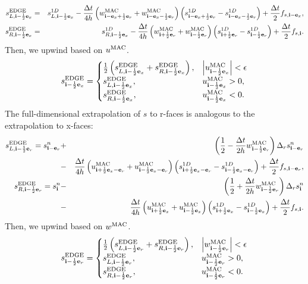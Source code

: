 \begin{eqnarray}
s_{L,{\bf i}-\frac{1}{2}{\bf e}_x}^{\rm EDGE} &=& s_{L,{\bf i}-\frac{1}{2}{\bf e}_x}^{1D} - \frac{\Delta t}{4h}\left(w_{{\bf i}-{\bf e}_x+\frac{1}{2}{\bf e}_r}^{\rm MAC}+w_{{\bf i}-{\bf e}_x-\frac{1}{2}{\bf e}_r}^{\rm MAC}\right)\left(s_{{\bf i}-{\bf e}_x+\frac{1}{2}{\bf e}_r}^{1D} - s_{{\bf i}-{\bf e}_x-\frac{1}{2}{\bf e}_r}^{1D}\right) + \frac{\Delta t}{2}f_{s,{\bf i}-{\bf e}_x}, \\
s_{R,{\bf i}-\frac{1}{2}{\bf e}_x}^{\rm EDGE} &=& s_{R,{\bf i}-\frac{1}{2}{\bf e}_x}^{1D} - \frac{\Delta t}{4h}\left(w_{{\bf i}+\frac{1}{2}{\bf e}_r}^{\rm MAC}+w_{{\bf i}-\frac{1}{2}{\bf e}_r}^{\rm MAC}\right)\left(s_{{\bf i}+\frac{1}{2}{\bf e}_r}^{1D} - s_{{\bf i}-\frac{1}{2}{\bf e}_r}^{1D}\right) + \frac{\Delta t}{2}f_{s,{\bf i}}.
\end{eqnarray}
Then, we upwind based on $u^{\rm MAC}$.
\begin{equation}
s_{{\bf i}-\frac{1}{2}{\bf e}_x}^{\rm EDGE} =
\begin{cases}
\frac{1}{2}\left(s_{L,{\bf i}-\frac{1}{2}{\bf e}_x}^{\rm EDGE} + s_{R,{\bf i}-\frac{1}{2}{\bf e}_x}^{\rm EDGE}\right), & \left|u^{\rm MAC}_{{\bf i}-\frac{1}{2}{\bf e}_x}\right| < \epsilon \\
s_{L,{\bf i}-\frac{1}{2}{\bf e}_x}^{\rm EDGE}, & u^{\rm MAC}_{{\bf i}-\frac{1}{2}{\bf e}_x} > 0, \\
s_{R,{\bf i}-\frac{1}{2}{\bf e}_x}^{\rm EDGE}, & u^{\rm MAC}_{{\bf i}-\frac{1}{2}{\bf e}_x} < 0.
\end{cases}
\end{equation}
The full-dimensional extrapolation of $s$ to r-faces is analogous to
the extrapolation to x-faces:
\begin{eqnarray}
s_{L,{\bf i}-\frac{1}{2}{\bf e}_r}^{\rm EDGE} = s_{{\bf i}-{\bf e}_r}^n &+& \left(\frac{1}{2} - \frac{\Delta t}{2h}w_{{\bf i}-\frac{1}{2}{\bf e}_r}^{\rm MAC}\right)\Delta_r s_{{\bf i}-{\bf e}_r}^n \nonumber \\
&-& \frac{\Delta t}{4h}\left(u_{{\bf i}+\frac{1}{2}{\bf e}_x-{\bf e}_r}^{\rm MAC}+u_{{\bf i}-\frac{1}{2}{\bf e}_x-{\bf e}_r}^{\rm MAC}\right)\left(s_{{\bf i}+\frac{1}{2}{\bf e}_x-{\bf e}_r}^{1D} - s_{{\bf i}-\frac{1}{2}{\bf e}_x-{\bf e}_r}^{1D}\right) + \frac{\Delta t}{2}f_{s,{\bf i}-{\bf e}_r},  \\
s_{R,{\bf i}-\frac{1}{2}{\bf e}_r}^{\rm EDGE} = s_{{\bf i}}^n &-& \left(\frac{1}{2} + \frac{\Delta t}{2h}w_{{\bf i}-\frac{1}{2}{\bf e}_r}^{\rm MAC}\right)\Delta_r s_{{\bf i}}^n \nonumber \\
&-& \frac{\Delta t}{4h}\left(u_{{\bf i}+\frac{1}{2}{\bf e}_x}^{\rm MAC}+u_{{\bf i}-\frac{1}{2}{\bf e}_x}^{\rm MAC}\right)\left(s_{{\bf i}+\frac{1}{2}{\bf e}_x}^{1D} - s_{{\bf i}-\frac{1}{2}{\bf e}_x}^{1D}\right) + \frac{\Delta t}{2}f_{s,{\bf i}}. 
\end{eqnarray}
Then, we upwind based on $w^{\rm MAC}$.
\begin{equation}
s_{{\bf i}-\frac{1}{2}{\bf e}_r}^{\rm EDGE} =
\begin{cases}
\frac{1}{2}\left(s_{L,{\bf i}-\frac{1}{2}{\bf e}_r}^{\rm EDGE} + s_{R,{\bf i}-\frac{1}{2}{\bf e}_r}^{\rm EDGE}\right), & \left|w^{\rm MAC}_{{\bf i}-\frac{1}{2}{\bf e}_r}\right| < \epsilon \\
s_{L,{\bf i}-\frac{1}{2}{\bf e}_r}^{\rm EDGE}, & u^{\rm MAC}_{{\bf i}-\frac{1}{2}{\bf e}_r} > 0, \\
s_{R,{\bf i}-\frac{1}{2}{\bf e}_r}^{\rm EDGE}, & u^{\rm MAC}_{{\bf i}-\frac{1}{2}{\bf e}_r} < 0.
\end{cases}
\end{equation}

